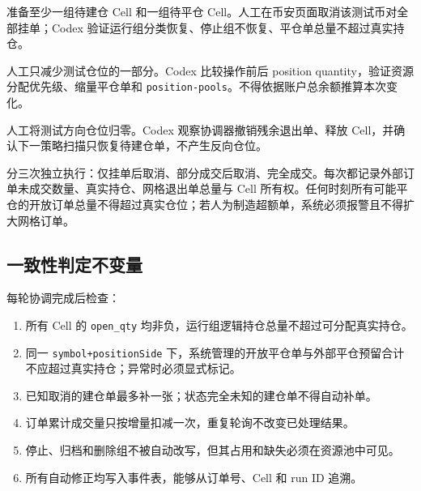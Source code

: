 
准备至少一组待建仓 Cell 和一组待平仓 Cell。人工在币安页面取消该测试币对全部挂单；Codex 验证运行组分类恢复、停止组不恢复、平仓单总量不超过真实持仓。


人工只减少测试仓位的一部分。Codex 比较操作前后 position quantity，验证资源分配优先级、缩量平仓单和 \texttt{position-pools}。不得依据账户总余额推算本次变化。


人工将测试方向仓位归零。Codex 观察协调器撤销残余退出单、释放 Cell，并确认下一策略扫描只恢复待建仓单，不产生反向仓位。


分三次独立执行：仅挂单后取消、部分成交后取消、完全成交。每次都记录外部订单未成交数量、真实持仓、网格退出单总量与 Cell 所有权。任何时刻所有可能平仓的开放订单总量不得超过真实仓位；若人为制造超额单，系统必须报警且不得扩大网格订单。

\subsection{一致性判定不变量}

每轮协调完成后检查：

\begin{enumerate}
  \item 所有 Cell 的 \texttt{open\_qty} 均非负，运行组逻辑持仓总量不超过可分配真实持仓。
  \item 同一 \texttt{symbol+positionSide} 下，系统管理的开放平仓单与外部平仓预留合计不应超过真实持仓；异常时必须显式标记。
  \item 已知取消的建仓单最多补一张；状态完全未知的建仓单不得自动补单。
  \item 订单累计成交量只按增量扣减一次，重复轮询不改变已处理结果。
  \item 停止、归档和删除组不被自动改写，但其占用和缺失必须在资源池中可见。
  \item 所有自动修正均写入事件表，能够从订单号、Cell 和 run ID 追溯。
\end{enumerate}
